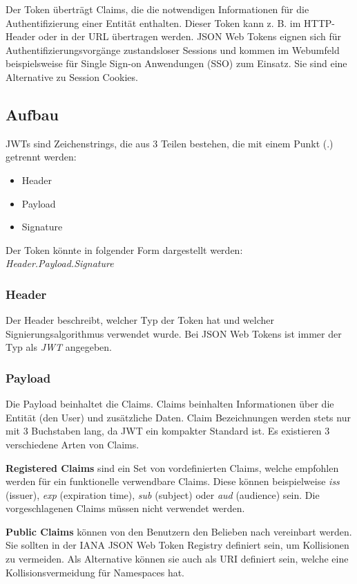 Der Token überträgt Claims, die die notwendigen Informationen für die Authentifizierung einer Entität enthalten. 
Dieser Token kann z. B. im HTTP-Header oder in der URL übertragen werden. JSON Web Tokens eignen sich für Authentifizierungsvorgänge zustandsloser Sessions und kommen 
im Webumfeld beispielsweise für Single Sign-on Anwendungen (SSO) zum Einsatz. Sie sind eine Alternative zu Session Cookies. 

\subsection{Aufbau}
JWTs sind Zeichenstrings, die aus 3 Teilen bestehen, die mit einem Punkt (.) getrennt werden:
\begin{itemize}
    \item Header
    \item Payload
    \item Signature
\end{itemize}
Der Token könnte in folgender Form dargestellt werden: \textit{Header.Payload.Signature}

\subsubsection{Header}
Der Header beschreibt, welcher Typ der Token hat und welcher Signierungsalgorithmus verwendet wurde. 
Bei JSON Web Tokens ist immer der Typ als \textit{JWT} angegeben.

\subsubsection{Payload}
Die Payload beinhaltet die Claims. Claims beinhalten Informationen über die Entität (den User) und zusätzliche Daten. 
Claim Bezeichnungen werden stets nur mit 3 Buchstaben lang, da JWT ein kompakter Standard ist. Es existieren 3 verschiedene Arten von Claims. 

\textbf{Registered Claims} sind ein Set von vordefinierten Claims, welche empfohlen werden für ein funktionelle verwendbare Claims. 
Diese können beispielweise \textit{iss} (issuer), \textit{exp} (expiration time), \textit{sub} (subject) oder \textit{aud} (audience) sein. 
Die vorgeschlagenen Claims müssen nicht verwendet werden. 

\textbf{Public Claims} können von den Benutzern den Belieben nach vereinbart werden. Sie sollten in der 
IANA JSON Web Token Registry definiert sein, um Kollisionen zu vermeiden. Als Alternative können sie auch als URI definiert sein, welche eine Kollisionsvermeidung für Namespaces hat.

